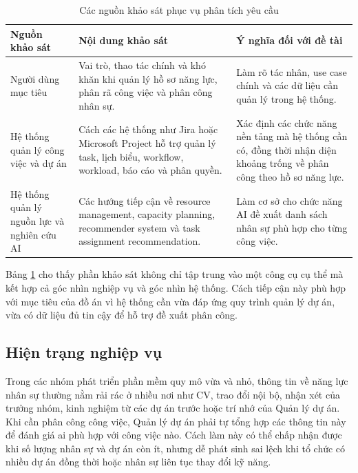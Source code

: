 \documentclass[../DoAn.tex]{subfiles}
\begin{document}
\begin{table}[H]
    \centering
    \caption{Các nguồn khảo sát phục vụ phân tích yêu cầu}
    \label{table:nguon_khao_sat}
    \begin{tabular}{|>{\raggedright\arraybackslash}p{}|>{\raggedright\arraybackslash}p{}|>{\raggedright\arraybackslash}p{}|}
        \hline
        \textbf{Nguồn khảo sát} & \textbf{Nội dung khảo sát} & \textbf{Ý nghĩa đối với đề tài} \\ \hline
        Người dùng mục tiêu & Vai trò, thao tác chính và khó khăn khi quản lý hồ sơ năng lực, phân rã công việc và phân công nhân sự. & Làm rõ tác nhân, use case chính và các dữ liệu cần quản lý trong hệ thống. \\ \hline
        Hệ thống quản lý công việc và dự án & Cách các hệ thống như Jira hoặc Microsoft Project hỗ trợ quản lý task, lịch biểu, workflow, workload, báo cáo và phân quyền. & Xác định các chức năng nền tảng mà hệ thống cần có, đồng thời nhận diện khoảng trống về phân công theo hồ sơ năng lực. \\ \hline
        Hệ thống quản lý nguồn lực và nghiên cứu AI & Các hướng tiếp cận về resource management, capacity planning, recommender system và task assignment recommendation. & Làm cơ sở cho chức năng AI đề xuất danh sách nhân sự phù hợp cho từng công việc. \\ \hline
    \end{tabular}
\end{table}

Bảng \ref{table:nguon_khao_sat} cho thấy phần khảo sát không chỉ tập trung vào một công cụ cụ thể mà kết hợp cả góc nhìn nghiệp vụ và góc nhìn hệ thống. Cách tiếp cận này phù hợp với mục tiêu của đồ án vì hệ thống cần vừa đáp ứng quy trình quản lý dự án, vừa có dữ liệu đủ tin cậy để hỗ trợ đề xuất phân công.

\subsection{Hiện trạng nghiệp vụ}
\label{subsection:2.1.2}
Trong các nhóm phát triển phần mềm quy mô vừa và nhỏ, thông tin về năng lực nhân sự thường nằm rải rác ở nhiều nơi như CV, trao đổi nội bộ, nhận xét của trưởng nhóm, kinh nghiệm từ các dự án trước hoặc trí nhớ của Quản lý dự án. Khi cần phân công công việc, Quản lý dự án phải tự tổng hợp các thông tin này để đánh giá ai phù hợp với công việc nào. Cách làm này có thể chấp nhận được khi số lượng nhân sự và dự án còn ít, nhưng dễ phát sinh sai lệch khi tổ chức có nhiều dự án đồng thời hoặc nhân sự liên tục thay đổi kỹ năng.
\end{document}
